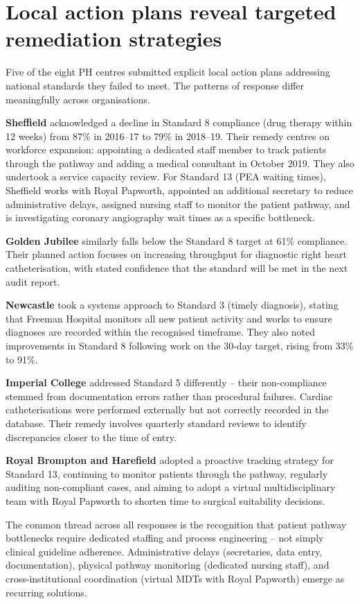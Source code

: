 \documentclass[11pt,a4paper]{article}
\begin{document}
\section{Local action plans reveal targeted remediation strategies}

Five of the eight PH centres submitted explicit local action plans addressing national standards they failed to meet. The patterns of response differ meaningfully across organisations.

\textbf{Sheffield} acknowledged a decline in Standard 8 compliance (drug therapy within 12 weeks) from 87\% in 2016--17 to 79\% in 2018--19. Their remedy centres on workforce expansion: appointing a dedicated staff member to track patients through the pathway and adding a medical consultant in October 2019. They also undertook a service capacity review. For Standard 13 (PEA waiting times), Sheffield works with Royal Papworth, appointed an additional secretary to reduce administrative delays, assigned nursing staff to monitor the patient pathway, and is investigating coronary angiography wait times as a specific bottleneck.

\textbf{Golden Jubilee} similarly falls below the Standard 8 target at 61\% compliance. Their planned action focuses on increasing throughput for diagnostic right heart catheterisation, with stated confidence that the standard will be met in the next audit report.

\textbf{Newcastle} took a systems approach to Standard 3 (timely diagnosis), stating that Freeman Hospital monitors all new patient activity and works to ensure diagnoses are recorded within the recognised timeframe. They also noted improvements in Standard 8 following work on the 30-day target, rising from 33\% to 91\%.

\textbf{Imperial College} addressed Standard 5 differently -- their non-compliance stemmed from documentation errors rather than procedural failures. Cardiac catheterisations were performed externally but not correctly recorded in the database. Their remedy involves quarterly standard reviews to identify discrepancies closer to the time of entry.

\textbf{Royal Brompton and Harefield} adopted a proactive tracking strategy for Standard 13, continuing to monitor patients through the pathway, regularly auditing non-compliant cases, and aiming to adopt a virtual multidisciplinary team with Royal Papworth to shorten time to surgical suitability decisions.

The common thread across all responses is the recognition that patient pathway bottlenecks require dedicated staffing and process engineering -- not simply clinical guideline adherence. Administrative delays (secretaries, data entry, documentation), physical pathway monitoring (dedicated nursing staff), and cross-institutional coordination (virtual MDTs with Royal Papworth) emerge as recurring solutions.
\end{document}
